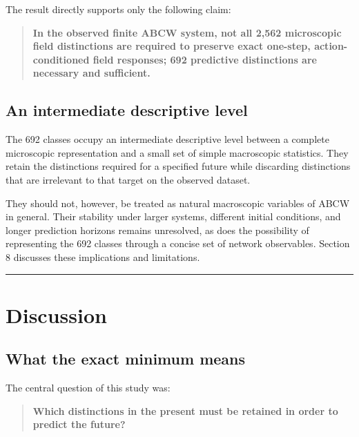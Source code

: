 \documentclass[
  11pt,
]{article}
\begin{document}
The result directly supports only the following claim:

\begin{quote}
\textbf{In the observed finite ABCW system, not all 2,562 microscopic
field distinctions are required to preserve exact one-step,
action-conditioned field responses; 692 predictive distinctions are
necessary and sufficient.}
\end{quote}

\hypertarget{an-intermediate-descriptive-level}{%
\subsection{An intermediate descriptive
level}\label{an-intermediate-descriptive-level}}

The 692 classes occupy an intermediate descriptive level between a
complete microscopic representation and a small set of simple
macroscopic statistics. They retain the distinctions required for a
specified future while discarding distinctions that are irrelevant to
that target on the observed dataset.

They should not, however, be treated as natural macroscopic variables of
ABCW in general. Their stability under larger systems, different initial
conditions, and longer prediction horizons remains unresolved, as does
the possibility of representing the 692 classes through a concise set of
network observables. Section 8 discusses these implications and
limitations.

\begin{center}\rule{0.5\linewidth}{0.5pt}\end{center}

\hypertarget{discussion}{%
\section{Discussion}\label{discussion}}

\hypertarget{what-the-exact-minimum-means}{%
\subsection{What the exact minimum
means}\label{what-the-exact-minimum-means}}

The central question of this study was:

\begin{quote}
\textbf{Which distinctions in the present must be retained in order to
predict the future?}
\end{quote}
\end{document}
